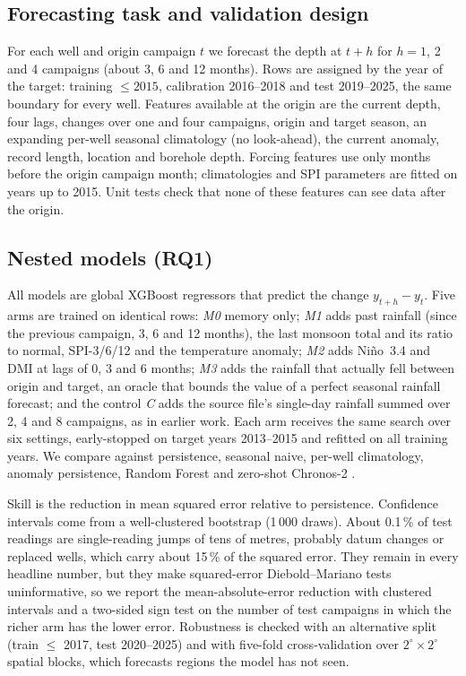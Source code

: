 \documentclass[hess, manuscript]{copernicus}
\begin{document}
\subsection{Forecasting task and validation design}
For each well and origin campaign $t$ we forecast the depth at $t+h$ for $h=1$, 2 and 4 campaigns (about 3, 6 and 12 months).
Rows are assigned by the year of the target: training $\le 2015$, calibration 2016--2018 and test 2019--2025, the same
boundary for every well. Features available at the origin are the current depth, four lags, changes over one and four
campaigns, origin and target season, an expanding per-well seasonal climatology (no look-ahead), the current anomaly,
record length, location and borehole depth. Forcing features use only months before the origin campaign month; climatologies
and SPI parameters \citep{mckee1993spi} are fitted on years up to 2015. Unit tests check that none of these features can see
data after the origin.

\subsection{Nested models (RQ1)}
All models are global XGBoost regressors \citep{chen2016xgboost} that predict the change $y_{t+h}-y_t$. Five arms are trained
on identical rows: \emph{M0} memory only; \emph{M1} adds past rainfall (since the previous campaign, 3, 6 and 12 months),
the last monsoon total and its ratio to normal, SPI-3/6/12 and the temperature anomaly; \emph{M2} adds Ni\~no~3.4 and DMI at
lags of 0, 3 and 6 months; \emph{M3} adds the rainfall that actually fell between origin and target, an oracle that bounds the
value of a perfect seasonal rainfall forecast; and the control \emph{C} adds the source file's single-day rainfall summed over
2, 4 and 8 campaigns, as in earlier work. Each arm receives the same search over six settings, early-stopped on target years
2013--2015 and refitted on all training years. We compare against persistence, seasonal naive, per-well climatology, anomaly
persistence, Random Forest and zero-shot Chronos-2 \citep{ansari2024chronos}.

Skill is the reduction in mean squared error relative to persistence. Confidence intervals come from a well-clustered
bootstrap (1\,000 draws). About 0.1\,\% of test readings are single-reading jumps of tens of metres, probably datum changes
or replaced wells, which carry about 15\,\% of the squared error. They remain in every headline number, but they make
squared-error Diebold--Mariano tests \citep{diebold1995comparing} uninformative, so we report the mean-absolute-error reduction
with clustered intervals and a two-sided sign test on the number of test campaigns in which the richer arm has the lower
error. Robustness is checked with an alternative split (train $\le$ 2017, test 2020--2025) and with five-fold cross-validation
over $2^\circ \times 2^\circ$ spatial blocks, which forecasts regions the model has not seen.
\end{document}
